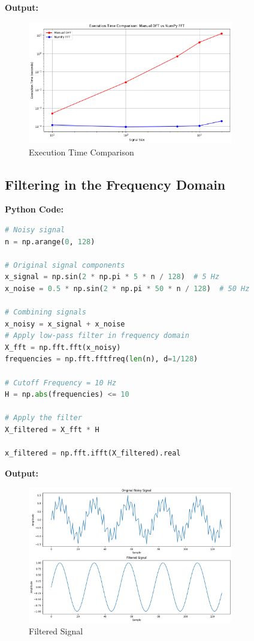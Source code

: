\documentclass[a4paper,12pt]{article}
\begin{document}
\textbf{Output:}
\begin{figure}[h]
    \centering
    \includegraphics[width=0.8\textwidth]{5.png}
    \caption{Execution Time Comparison}
    \label{fig:fft_efficiency}
\end{figure}

\subsection*{Filtering in the Frequency Domain}

\textbf{Python Code:}
\begin{lstlisting}[language=Python, caption=Low-pass Filtering]
# Noisy signal
n = np.arange(0, 128)
    
# Original signal components
x_signal = np.sin(2 * np.pi * 5 * n / 128)  # 5 Hz
x_noise = 0.5 * np.sin(2 * np.pi * 50 * n / 128)  # 50 Hz
    
# Combining signals
x_noisy = x_signal + x_noise
# Apply low-pass filter in frequency domain
X_fft = np.fft.fft(x_noisy)
frequencies = np.fft.fftfreq(len(n), d=1/128)

# Cutoff Frequency = 10 Hz
H = np.abs(frequencies) <= 10

# Apply the filter
X_filtered = X_fft * H

x_filtered = np.fft.ifft(X_filtered).real
\end{lstlisting}

\textbf{Output:}
\begin{figure}[h]
    \centering
    \includegraphics[width=0.8\textwidth]{6.png}
    \caption{Filtered Signal}
    \label{fig:filtered_signal}
\end{figure}
\end{document}
